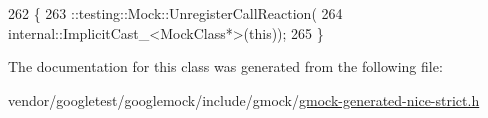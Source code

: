 \begin{DoxyCode}
262                        \{
263     ::testing::Mock::UnregisterCallReaction(
264         internal::ImplicitCast\_<MockClass*>(\textcolor{keyword}{this}));
265   \}
\end{DoxyCode}


The documentation for this class was generated from the following file\+:\begin{DoxyCompactItemize}
\item 
vendor/googletest/googlemock/include/gmock/\hyperlink{gmock-generated-nice-strict_8h}{gmock-\/generated-\/nice-\/strict.\+h}\end{DoxyCompactItemize}
